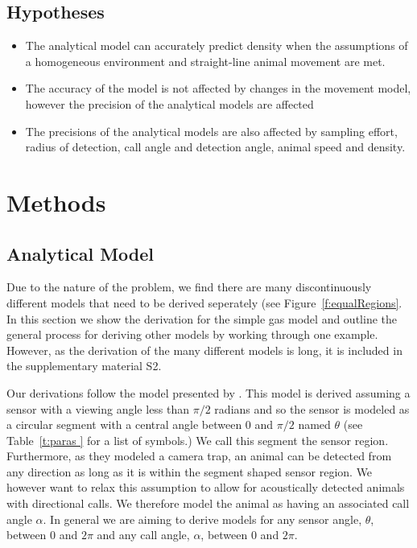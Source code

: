 \documentclass[a4paper,10pt,reqno,oneside]{amsart}
\begin{document}
\subsection{Hypotheses}

\begin{itemize}
\item The analytical model can accurately predict density when the assumptions of a homogeneous environment and straight-line animal movement are met.
\item The accuracy of the model is not affected by changes in the movement model, however the precision of the analytical models are affected
\item The precisions of the analytical models are also affected by sampling effort, radius of detection, call angle and detection angle, animal speed and density.
\end{itemize}


\section{Methods}

\subsection{Analytical Model}

Due to the nature of the problem, we find there are many discontinuously different models that need to be derived seperately (see Figure~\ref{f:equalRegions}. In this section we show the derivation for the simple gas model and outline the general process for deriving other models by working through one example. However, as the derivation of the many different models is long, it is included in the supplementary material S2.

Our derivations follow the model presented by \citep{rowcliffe2008estimating}. This model is derived assuming a sensor with a viewing angle less than $\pi/2$ radians and so the sensor is modeled as a circular segment with a central angle between 0 and  $\pi/2$ named  $\theta$ (see Table~\ref{t:paras
} for a list of symbols.) We call this segment the sensor region. Furthermore, as they modeled a camera trap, an animal can be detected from any direction as long as it is within the segment shaped sensor region. We however want to relax this assumption to allow for acoustically detected animals with directional calls. We therefore model the animal as having an associated call angle $\alpha$. In general we are aiming to derive models for any sensor angle, $ \theta$, between 0 and $2\pi$ and any call angle, $ \alpha$, between 0 and $2\pi$. 
\end{document}
